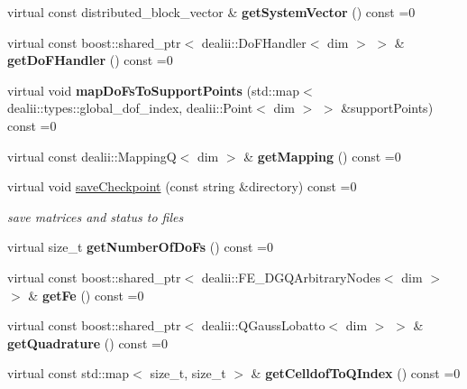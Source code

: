 \begin{DoxyCompactItemize}
\item 
\hypertarget{classnatrium_1_1AdvectionOperator_aa1eb5cd5a2c1b6b3b8f6395bac67ef55}{
virtual const distributed\_\-block\_\-vector \& {\bfseries getSystemVector} () const =0}
\label{classnatrium_1_1AdvectionOperator_aa1eb5cd5a2c1b6b3b8f6395bac67ef55}

\item 
\hypertarget{classnatrium_1_1AdvectionOperator_acf18a849f6d7b81083d1fee462f87500}{
virtual const boost::shared\_\-ptr$<$ dealii::DoFHandler$<$ dim $>$ $>$ \& {\bfseries getDoFHandler} () const =0}
\label{classnatrium_1_1AdvectionOperator_acf18a849f6d7b81083d1fee462f87500}

\item 
\hypertarget{classnatrium_1_1AdvectionOperator_a6171b5c645167a5e81f56964f1b9ae6f}{
virtual void {\bfseries mapDoFsToSupportPoints} (std::map$<$ dealii::types::global\_\-dof\_\-index, dealii::Point$<$ dim $>$ $>$ \&supportPoints) const =0}
\label{classnatrium_1_1AdvectionOperator_a6171b5c645167a5e81f56964f1b9ae6f}

\item 
\hypertarget{classnatrium_1_1AdvectionOperator_aa1c9d47c0cb17019bb122a4e45051ffa}{
virtual const dealii::MappingQ$<$ dim $>$ \& {\bfseries getMapping} () const =0}
\label{classnatrium_1_1AdvectionOperator_aa1c9d47c0cb17019bb122a4e45051ffa}

\item 
virtual void \hyperlink{classnatrium_1_1AdvectionOperator_aca14260bae100874b0050a2a96d7a564}{saveCheckpoint} (const string \&directory) const =0
\begin{DoxyCompactList}\small\item\em save matrices and status to files \item\end{DoxyCompactList}\item 
\hypertarget{classnatrium_1_1AdvectionOperator_a251e21d1dd023926d4c5f7fd973b90bf}{
virtual size\_\-t {\bfseries getNumberOfDoFs} () const =0}
\label{classnatrium_1_1AdvectionOperator_a251e21d1dd023926d4c5f7fd973b90bf}

\item 
\hypertarget{classnatrium_1_1AdvectionOperator_ad282440d7dbee0e78f6489e9878d1b41}{
virtual const boost::shared\_\-ptr$<$ dealii::FE\_\-DGQArbitraryNodes$<$ dim $>$ $>$ \& {\bfseries getFe} () const =0}
\label{classnatrium_1_1AdvectionOperator_ad282440d7dbee0e78f6489e9878d1b41}

\item 
\hypertarget{classnatrium_1_1AdvectionOperator_adf5b566df5abc5ad2afa8977e83bb518}{
virtual const boost::shared\_\-ptr$<$ dealii::QGaussLobatto$<$ dim $>$ $>$ \& {\bfseries getQuadrature} () const =0}
\label{classnatrium_1_1AdvectionOperator_adf5b566df5abc5ad2afa8977e83bb518}

\item 
\hypertarget{classnatrium_1_1AdvectionOperator_a88232d5ef52ce0db77133682e26a5760}{
virtual const std::map$<$ size\_\-t, size\_\-t $>$ \& {\bfseries getCelldofToQIndex} () const =0}
\label{classnatrium_1_1AdvectionOperator_a88232d5ef52ce0db77133682e26a5760}

\end{DoxyCompactItemize}


